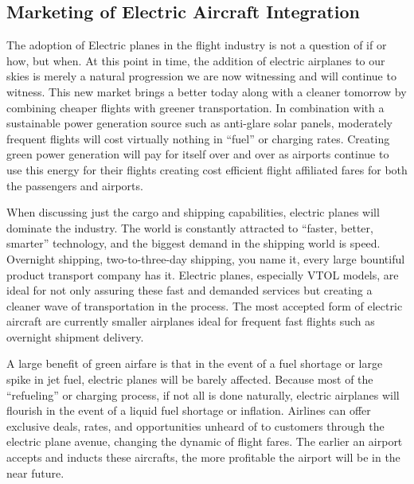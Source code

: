 \documentclass[../main.tex]{subfiles}
\begin{document}
\subsection{Marketing of Electric Aircraft Integration} %
The adoption of Electric planes in the flight industry is not a question of if or how, but when. At this point in time, the addition of electric airplanes to our skies is merely a natural progression we are now witnessing and will continue to witness. This new market brings a better today along with a cleaner tomorrow by combining cheaper flights with greener transportation. In combination with a sustainable power generation source such as anti-glare solar panels, moderately frequent flights will cost virtually nothing in “fuel” or charging rates. Creating green power generation will pay for itself over and over as airports continue to use this energy for their flights creating cost efficient flight affiliated fares for both the passengers and airports.\par
When discussing just the cargo and shipping capabilities, electric planes will dominate the industry. The world is constantly attracted to “faster, better, smarter” technology, and the biggest demand in the shipping world is speed. Overnight shipping, two-to-three-day shipping, you name it, every large bountiful product transport company has it. Electric planes, especially VTOL models, are ideal for not only assuring these fast and demanded services but creating a cleaner wave of transportation in the process. The most accepted form of electric aircraft are currently smaller airplanes ideal for frequent fast flights such as overnight shipment delivery.\par
A large benefit of green airfare is that in the event of a fuel shortage or large spike in jet fuel, electric planes will be barely affected. Because most of the “refueling” or charging process, if not all is done naturally, electric airplanes will flourish in the event of a liquid fuel shortage or inflation. Airlines can offer exclusive deals, rates, and opportunities unheard of to customers through the electric plane avenue, changing the dynamic of flight fares.  The earlier an airport accepts and inducts these aircrafts, the more profitable the airport will be in the near future.\par 
\end{document}
